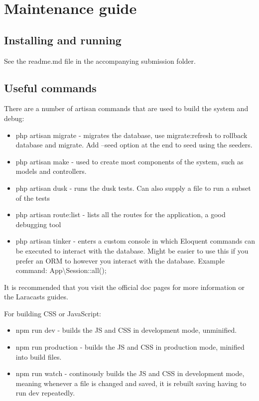\chapter{Maintenance guide}
\section{Installing and running}
See the readme.md file in the accompanying submission folder.

\section{Useful commands}
There are a number of artisan commands that are used to build the system and debug:
\begin{itemize}
	\item php artisan migrate - migrates the database, use migrate:refresh to rollback database and migrate. Add --seed option at the end to seed using the seeders.
	\item php artisan make - used to create most components of the system, such as models and controllers. 
	\item php artisan dusk - runs the dusk tests. Can also supply a file to run a subset of the tests
	\item php artisan route:list - lists all the routes for the application, a good debugging tool
	\item php artisan tinker - enters a custom console in which Eloquent commands can be executed to interact with the database. Might be easier to use this if you prefer an ORM to however you interact with the database. Example command: App\textbackslash Session::all();
\end{itemize}
It is recommended that you visit the official doc pages for more information\cite{laravel-docs} or the Laracasts guides\cite{laracasts}.

For building CSS or JavaScript: 
\begin{itemize}
	\item npm run dev - builds the JS and CSS in development mode, unminified.
	\item npm run production - builds the JS and CSS in production mode, minified into build files.
	\item npm run watch - continously builds the JS and CSS in development mode, meaning whenever a file is changed and saved, it is rebuilt saving having to run dev repeatedly.
\end{itemize}

